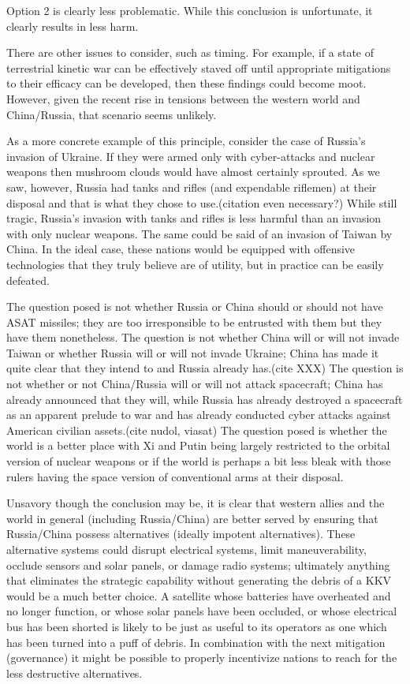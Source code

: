 Option 2 is clearly less problematic.  While this conclusion is
unfortunate, it clearly results in less harm.

There are other issues to consider, such as timing.  For example, if a
state of terrestrial kinetic war can be effectively staved off until
appropriate mitigations to their efficacy can be developed, then these
findings could become moot.  However, given the recent rise in
tensions between the western world and China/Russia, that scenario
seems unlikely.

As a more concrete example of this principle, consider the case of
Russia's invasion of Ukraine.  If they were armed only with
cyber-attacks and nuclear weapons then mushroom clouds would have
almost certainly sprouted.  As we saw, however, Russia had tanks and
rifles (and expendable riflemen) at their disposal and that is what
they chose to use.(citation even necessary?)  While still tragic,
Russia's invasion with tanks and rifles is less harmful than an
invasion with only nuclear weapons.  The same could be said of an
invasion of Taiwan by China.  In the ideal case, these nations would
be equipped with offensive technologies that they truly believe are of
utility, but in practice can be easily defeated.

The question posed is not whether Russia or China should or should not
have ASAT missiles; they are too irresponsible to be entrusted with
them but they have them nonetheless.  The question is not whether
China will or will not invade Taiwan or whether Russia will or will
not invade Ukraine; China has made it quite clear that they intend to
and Russia already has.(cite XXX) The question is not whether or not
China/Russia will or will not attack spacecraft; China has already
announced that they will, while Russia has already destroyed a
spacecraft as an apparent prelude to war and has already conducted
cyber attacks against American civilian assets.(cite nudol, viasat)
The question posed is whether the world is a better place with Xi and
Putin being largely restricted to the orbital version of nuclear
weapons or if the world is perhaps a bit less bleak with those rulers
having the space version of conventional arms at their disposal.

Unsavory though the conclusion may be, it is clear that western allies
and the world in general (including Russia/China) are better served by
ensuring that Russia/China possess alternatives (ideally impotent
alternatives).  These alternative systems could disrupt electrical
systems, limit maneuverability, occlude sensors and solar panels, or
damage radio systems; ultimately anything that eliminates the
strategic capability without generating the debris of a KKV would be a
much better choice.  A satellite whose batteries have overheated and
no longer function, or whose solar panels have been occluded, or whose
electrical bus has been shorted is likely to be just as useful to its
operators as one which has been turned into a puff of debris.  In
combination with the next mitigation (governance) it might be possible
to properly incentivize nations to reach for the less destructive
alternatives.

